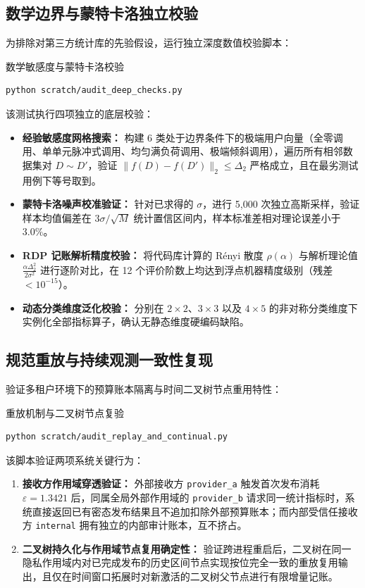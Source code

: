 \subsection{数学边界与蒙特卡洛独立校验}

为排除对第三方统计库的先验假设，运行独立深度数值校验脚本：

\begin{techbox}{数学敏感度与蒙特卡洛校验}
\begin{verbatim}
python scratch/audit_deep_checks.py
\end{verbatim}
\end{techbox}

该测试执行四项独立的底层校验：
\begin{itemize}[itemsep=2pt,topsep=2pt]
  \item \textbf{经验敏感度网格搜索：} 构建 6 类处于边界条件下的极端用户向量（全零调用、单单元脉冲式调用、均匀满负荷调用、极端倾斜调用），遍历所有相邻数据集对 $D \sim D'$，验证 $\|f(D) - f(D')\|_2 \le \Delta_2$ 严格成立，且在最劣测试用例下等号取到。
  \item \textbf{蒙特卡洛噪声校准验证：} 针对已求得的 $\sigma$，进行 5,000 次独立高斯采样，验证样本均值偏差在 $3\sigma/\sqrt{M}$ 统计置信区间内，样本标准差相对理论误差小于 $3.0\%$。
  \item \textbf{RDP 记账解析精度校验：} 将代码库计算的 Rényi 散度 $\rho(\alpha)$ 与解析理论值 $\frac{\alpha \Delta_2^2}{2\sigma^2}$ 进行逐阶对比，在 12 个评价阶数上均达到浮点机器精度级别（残差 $< 10^{-15}$）。
  \item \textbf{动态分类维度泛化校验：} 分别在 $2\times 2$、$3\times 3$ 以及 $4\times 5$ 的非对称分类维度下实例化全部指标算子，确认无静态维度硬编码缺陷。
\end{itemize}

\subsection{规范重放与持续观测一致性复现}

验证多租户环境下的预算账本隔离与时间二叉树节点重用特性：

\begin{techbox}{重放机制与二叉树节点复验}
\begin{verbatim}
python scratch/audit_replay_and_continual.py
\end{verbatim}
\end{techbox}

该脚本验证两项系统关键行为：
\begin{enumerate}[itemsep=1pt,topsep=2pt]
  \item \textbf{接收方作用域穿透验证：} 外部接收方 \verb|provider_a| 触发首次发布消耗 $\varepsilon=1.3421$ 后，同属全局外部作用域的 \verb|provider_b| 请求同一统计指标时，系统直接返回已有密态发布结果且不追加扣除外部预算账本；而内部受信任接收方 \verb|internal| 拥有独立的内部审计账本，互不挤占。
  \item \textbf{二叉树持久化与作用域节点复用确定性：} 验证跨进程重启后，二叉树在同一隐私作用域内对已完成发布的历史区间节点实现按位完全一致的重放复用输出，且仅在时间窗口拓展时对新激活的二叉树父节点进行有限增量记账。
\end{enumerate}

